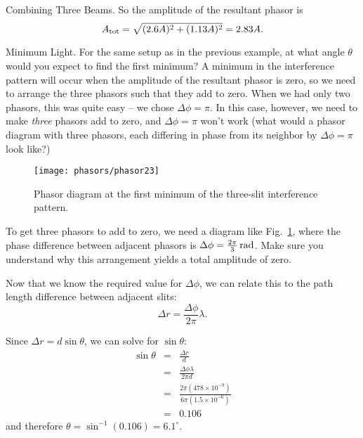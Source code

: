 \begin{example}{Combining Three Beams.}
So the amplitude of the resultant phasor is 
\begin{equation}
A_{\rm tot} = \sqrt{(2.6A)^2 + (1.13A)^2} = 2.83A.
\end{equation}

\end{example}

\begin{exampleb}{Minimum Light.} 
For the same setup as in the previous example, 
at what angle $\theta$ would you expect to find the first minimum?
\solution
A minimum in the interference pattern will occur when the amplitude of
the resultant phasor is zero, so we need to arrange the three phasors
such that they add to zero. When we had only two phasors, this was
quite easy -- we chose $\Delta \phi = \pi$. In this case, however, we
need to make {\em three} phasors add to zero, and $\Delta \phi = \pi$
won't work (what would a phasor diagram with three phasors, each
differing in phase from its neighbor by $\Delta \phi = \pi$ look like?)

\begin{figure}\begin{center}
 \texttt{[image: phasors/phasor23]} 
\caption{\label{fig:phasor23}Phasor diagram at the first minimum of the three-slit
interference pattern.}
\end{center}
\end{figure}
 

To get three phasors to add to zero, we need a diagram like
Fig.~\ref{fig:phasor23}, where the phase difference between adjacent
phasors is $\Delta\phi = \frac{2\pi}{3}\,\mbox{rad}$. Make sure you
understand why this arrangement yields a total amplitude of zero.

Now that we know the required value for $\Delta\phi$, we can relate
this to the path length difference between adjacent slits:
\begin{equation}
\Delta r = \frac{\Delta\phi}{2\pi} \lambda.
\end{equation} 

Since $\Delta r = d\sin{\theta}$, we can solve for $\sin{\theta}$:
\begin{eqnarray*}
\sin{\theta} & = & \frac{\Delta r}{d} \\
             & = & \frac{\Delta\phi\lambda}{2\pi d} \\
             & = & \frac{2\pi(478 \times 10^{-9})}{6 \pi (1.5 \times 10^{-6})}\\
             & = & 0.106
\end{eqnarray*}
and therefore $\theta = \sin^{-1}{(0.106)} = 6.1^\circ$.



\end{exampleb}
